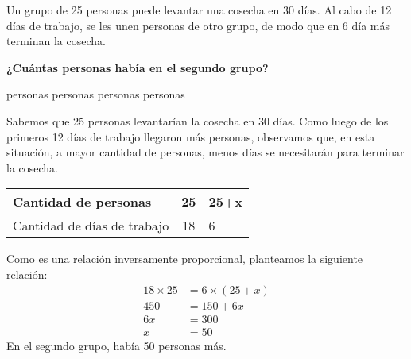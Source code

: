 Un grupo de 25 personas puede levantar una cosecha en 30 días. Al cabo de 12 días de trabajo,
se les unen personas de otro grupo, de modo que en 6 día
más terminan la cosecha.

\textbf{¿Cuántas personas había en el segundo grupo?}

\begin{oneparchoices}
     personas
     personas
     personas
     personas
\end{oneparchoices}


\begin{solutionbox}{8cm}
    Sabemos que 25 personas levantarían la cosecha en 30 días. Como luego de los primeros 12 días de trabajo llegaron más personas, observamos que, en esta situación, a mayor cantidad de personas, menos días se necesitarán para terminar la cosecha.
    \begin{table}[H]
        \centering
        \begin{tabular}{|l|c|l|}
            \hline
            Cantidad de personas        & 25 & 25+x \\
            \hline
            Cantidad de días de trabajo & 18 & 6    \\
            \hline
        \end{tabular}
    \end{table}
    Como es una relación inversamente proporcional, planteamos la siguiente relación:
    \begin{align*}
        18 \times 25 & = 6 \times (25+x) \\
        450          & = 150 +6x         \\
        6x           & = 300             \\
        x            & = 50
    \end{align*}
    En el segundo grupo, había 50 personas más.
\end{solutionbox}
